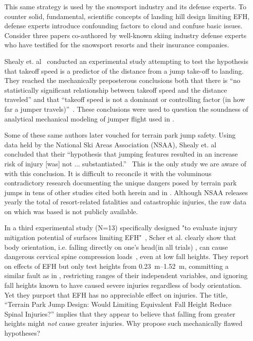 \documentclass[smallextended]{svjour3}       %
\begin{document}
This same strategy is used by the snowsport industry and its defense experts. To counter solid,
fundamental, scientific concepts of landing hill design limiting EFH, defense
experts introduce confounding factors to cloud and confuse basic issues.
Consider three papers \cite{Shealy2010,Shealy2015,Scher2015} co-authored by
well-known skiing industry defense experts who have testified for the snowsport
resorts and their insurance companies.

Shealy et. al~\cite{Shealy2010} conducted an experimental study attempting to
test the hypothesis that takeoff speed is a predictor of the distance from a
jump take-off to landing. They reached the mechanically preposterous
conclusions both that there is ``no statistically significant relationship
between takeoff speed and the distance traveled'' and that ``takeoff speed is
not a dominant or controlling factor (in how far a jumper
travels)''~\cite{Shealy2010}. These conclusions were used to question the
soundness of analytical mechanical modeling of jumper flight used in
\cite{Hubbard2009,McNeil2012}.

Some of these same authors later vouched for terrain park jump safety. Using
data held by the National Ski Areas Association (NSAA), Shealy et.
al~\cite{Shealy2015} concluded that their ``hypothesis that jumping features
resulted in an increase risk of injury [was] not ...
substantiated.''~\cite{Shealy2015} This is the only study we are aware of with
this conclusion. It is difficult to reconcile it with the voluminous
contradictory research documenting the unique dangers posed by terrain park
jumps in tens of other studies cited both herein and in
\cite{Hubbard2009,Swedberg2012,McNeil2012,McNeil2012a,Hubbard2015,Levy2015,Petrone2017,Moore2018}.
Although NSAA releases yearly the total of resort-related fatalities and
catastrophic injuries, the raw data on which \cite{Shealy2015} was based is not
publicly available.

In a third experimental study (N=13) specifically designed "to evaluate injury
mitigation potential of surfaces limiting EFH"~\cite{Scher2015}, Scher et al. clearly show that
body orientation, i.e. falling directly on one's head(in all trials) , can cause dangerous
cervical spine compression loads~\cite{Scher2015}, even at low fall heights. They report on
effects of EFH but only test heights from \SIrange{0.23}{1.52}{\meter},
committing a similar fault as in \cite{Shealy2010}, restricting ranges of their
independent variables, and ignoring fall heights known to have caused severe
injuries regardless of body orientation. Yet they purport that EFH has no appreciable
effect on injuries. The title, ``Terrain Park Jump Design: Would Limiting
Equivalent Fall Height Reduce Spinal Injuries?'' implies that they appear to
believe that falling from greater heights might \emph{not} cause greater
injuries. Why propose such mechanically flawed hypotheses?
\end{document}
